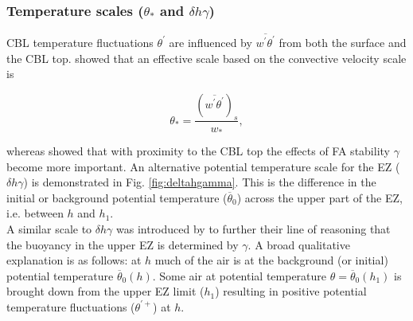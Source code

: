 \subsubsection{Temperature scales ($\theta_{*}$ and $\delta h \gamma$)}
\label{subsubsec:tempscales}

CBL temperature fluctuations $\theta^{'}$ are influenced by $\overline{w^{'}\theta^{'}}$ from both the surface and the CBL top.  \cite{Deardorff70} showed that an effective scale based on the convective velocity scale is

\begin{equation}
\theta_{*} = \frac{(\overline{w^{'}\theta^{'}})_{s}}{w_{*}},
\end{equation} 

whereas \cite{Sorbjan1} showed that with proximity to the CBL top the effects of FA stability $\gamma$ become more important.  An alternative potential temperature scale for the EZ ($\delta h \gamma$) is demonstrated in Fig. \ref{fig:deltahgamma}. This is the difference in the initial or background potential temperature ($\overline{\theta}_{0}$) across the upper part of the EZ, i.e. between $h$ and $h_{1}$.\\      

A similar scale to $\delta h \gamma$ was introduced by \cite{GarciaMellado} to further their line of reasoning that the buoyancy in the upper EZ is determined by $\gamma$. A broad qualitative explanation is as follows: at $h$ much of the air is at the background (or initial) potential temperature $\overline{\theta}_{0}(h)$.  Some air at potential temperature $\theta = \overline{\theta}_{0}(h_{1})$ is brought down from the upper EZ limit ($h_{1}$) resulting in positive potential temperature fluctuations ($\theta^{'+}$) at $h$.\\

